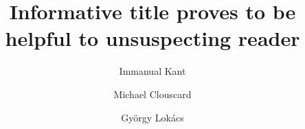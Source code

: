 \makeatletter
\renewcommand\AB@authnote[1]{{\normalfont\textsuperscript{#1}}}
\renewcommand\AB@affilnote[1]{{\normalfont\textsuperscript{#1}}}
\makeatother
\title{Informative title proves to be helpful to unsuspecting reader}
\author[1,*]{Immanual Kant}
\author[1]{Michael Clouscard}
\author[1, 2]{György Lokács}
